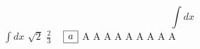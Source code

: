 \documentclass{article}
\begin{document}
\begin{equation}
  \int dx 
\end{equation}
\newpage
$\int dx$
\newpage
$\sqrt2$
\newpage
$\frac23$
\newpage
\ 
\newpage
\( \begin{array}{|r|} \hline a \cr \hline \end{array} \)
\newpage
\Huge A \LARGE A \Large A \large A \normalsize A \small A
\footnotesize A \scriptsize A \tiny A
\end{document}

